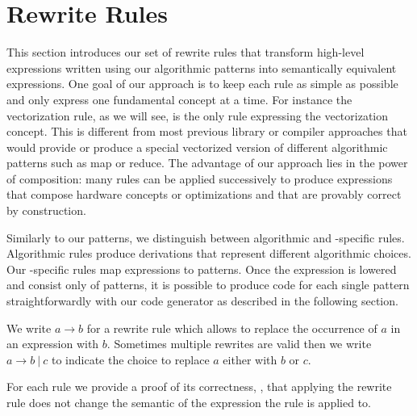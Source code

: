 \section{Rewrite Rules}
\label{section:rules}

This section introduces our set of rewrite rules that transform high-level expressions written using our algorithmic patterns into semantically equivalent expressions.
One goal of our approach is to keep each rule as simple as possible and only express one fundamental concept at a time.
For instance the vectorization rule, as we will see, is the only rule expressing the vectorization concept.
This is different from most previous library or compiler approaches that would provide or produce a special vectorized version of different algorithmic patterns such as map or reduce.
The advantage of our approach lies in the power of composition:
many rules can be applied successively to produce expressions that compose hardware concepts or optimizations and that are provably correct by construction.

Similarly to our patterns, we distinguish between algorithmic and \OpenCL-specific rules.
Algorithmic rules produce derivations that represent different algorithmic choices.
Our \OpenCL-specific rules map expressions to \OpenCL patterns.
Once the expression is lowered and consist only of \OpenCL patterns, it is possible to produce \OpenCL code for each single pattern straightforwardly with our code generator as described in the following section.

We write $a \rightarrow b$ for a rewrite rule which allows to replace the occurrence of $a$ in an expression with $b$.
Sometimes multiple rewrites are valid then we write $a \rightarrow b\ |\ c$ to indicate the choice to replace $a$ either with $b$ or $c$.

For each rule we provide a proof of its correctness, \ie, that applying the rewrite rule does not change the semantic of the expression the rule is applied to.




